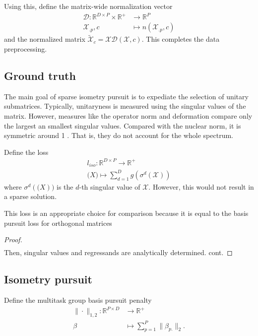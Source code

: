 Using this, define the matrix-wide normalization vector
\begin{align}
\mathcal D: \mathbb R^{D \times P} \times \mathbb R^+ &\to \mathbb R^P \\
\mathcal X_{.p}, c &\mapsto n(\mathcal X_{.p}, c)
\end{align}
and the normalized matrix $\tilde {\mathcal X}_c = \mathcal X \mathcal D(\mathcal X, c).$
This completes the data preprocessing.

\subsection{Ground truth}

The main goal of sparse isometry pursuit is to expediate the selection of unitary submatrices.
Typically, unitaryness is measured using the singular values of the matrix.
However, measures like the operator norm and deformation compare only the largest an smallest singular values.
Compared with the nuclear norm, it is symmetric around 1 \cite{Fazel2001ARM}. %
That is, they do not account for the whole spectrum.

Define the loss
\begin{align}
l_{iso}: \mathbb R^{D \times P} \to \mathbb R^{+} \\
\mathcal (X) \mapsto \sum_{d = 1}^D g(\sigma^d(\mathcal X))
\end{align}
where $\sigma^d (\mathcal (X))$ is the $d$-th singular value of $\mathcal X$.
However, this would not result in a sparse solution.

This loss is an appropriate choice for comparison because it is equal to the basis pursuit loss for orthogonal matrices
\begin{proposition}
\label{prop:main}
\end{proposition}
\begin{proof}
\begin{align}
\end{align}
Then, singular values and regressands are analytically determined.  cont.
\end{proof}

\subsection{Isometry pursuit}

Define the multitask group basis pursuit penalty %
\begin{align}
\label{eq:bp}
\| \cdot \|_{1,2}: \mathbb R^{P \times D} &\to \mathbb R^+ \\ 
\beta &\mapsto  \sum_{p=1}^P  \|\beta_{p.}\|_2.
\end{align}

